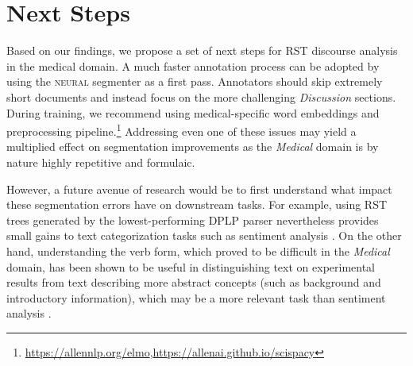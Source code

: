 \section{Next Steps}
\label{sec:next_steps}
Based on our findings, we propose a set of next steps for RST discourse analysis in the medical domain. A much faster annotation process can be adopted by using the \textsc{neural} segmenter as a first pass. Annotators should skip extremely short documents and instead focus on the more challenging \textit{Discussion} sections. During training, we recommend using medical-specific word embeddings and preprocessing pipeline.\footnote{\url{https://allennlp.org/elmo},\url{https://allenai.github.io/scispacy}} 
Addressing even one of these issues may yield a multiplied effect on segmentation improvements as the \textit{Medical} domain is by nature highly repetitive and formulaic.

However, a future avenue of research would be to first understand what impact these segmentation errors have on downstream tasks. For example, using RST trees generated by the lowest-performing \textsc{DPLP} parser nevertheless provides small gains to text categorization tasks such as sentiment analysis \cite{Ji:2017}. On the other hand, understanding the verb form, which proved to be difficult in the \textit{Medical} domain, has been shown to be useful in distinguishing text on experimental results from text describing more abstract concepts (such as background and introductory information), which may be a more relevant task than sentiment analysis \cite{deWaard:2012}. 

